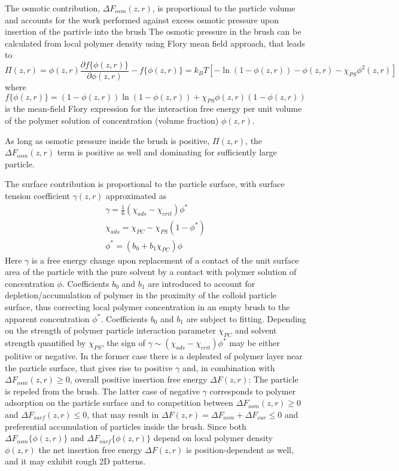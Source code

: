 \documentclass[12pt, a4paper]{article}
\begin{document}
The osmotic contribution, $\Delta F_{osm}(z,r)$, is proportional to the particle volume and accounts for the work performed against excess osmotic pressure upon insertion of the partivle into the brush
The osmotic pressure in the brush can be calculated from local polymer density using Flory mean field approach, that leads to 
\begin{equation}
	\Pi(z,r)=  \phi(z,r)\frac{\partial f\{\phi(z,r)\}}{\partial \phi(z,r)} - f\{\phi(z,r)\}= 
	k_BT[-\ln(1-\phi(z,r)) - \phi(z,r) -\chi_{PS}\phi^2(z,r)]
\end{equation}
where
$$
f\{\phi(z,r)\}=(1-\phi(z,r))\ln(1-\phi(z,r)) +\chi_{PS}\phi(z,r)(1-\phi(z,r))
$$
is the mean-field Flory expression for the interaction free energy per unit volume of the polymer solution of concentration (volume fraction) $\phi(z,r)$.

As long as osmotic pressure inside the brush is positive, $\Pi(z,r)$, the $\Delta F_{osm}(z,r)$ term is positive as well and dominating for sufficiently large particle. 

The surface contribution is proportional to the particle surface, with surface tension coefficient $\gamma (z,r)$ approximated as
\begin{eqnarray}
    \gamma = \frac{1}{6}(\chi_{ads} - \chi_{crit})\phi^{\ast}
    \\
    \chi_{ads} = \chi_{PC} - \chi_{PS}(1-\phi^{\ast})
    \\
    \phi^{\ast}= (b_{0} + b_{1}\chi_{PC})\phi
\end{eqnarray}
Here $\gamma$ is a free energy change upon replacement of a contact of the unit surface area of the particle with the pure solvent by a contact with polymer solution of concentration $\phi$.
Coefficients $b_0$ and $b_1$ are introduced to account for  depletion/accumulation of polymer in the proximity of the colloid particle surface, thus correcting local polymer concentration in an empty brush 
to the apparent concentration $\phi^{\ast}$. Coefficients $b_0$ and $b_1$ are subject to fitting.
Depending on the strength of polymer particle interaction parameter $\chi_{PC}$ and solvent strength quantified by  $\chi_{PS}$, the sign of $\gamma \sim (\chi_{ads} - \chi_{crit})\phi^{\ast}$ may be either politive or negative.
In the former case there is a depleated of polymer layer near the particle surface, that gives rise to positive $\gamma$ and, in combination with $\Delta F_{osm}(z,r)\geq 0$, overall positive insertion free energy $\Delta F(z,r)$: 
The particle is repeled from the brush. The latter case of negative $\gamma$ corresponds to polymer adsorption on the particle surface and to competition between $\Delta F_{osm}(z,r)\geq 0$ and $\Delta F_{surf}(z,r)\leq 0$, 
that may result in $\Delta F(z,r) = \Delta F_{osm} + \Delta F_{sur}\leq 0$ and preferential accumulation of particles inside the brush. Since both $\Delta F_{osm}\{\phi(z,r)\}$ and $\Delta F_{surf}\{\phi(z,r)\}$ depend
on local polymer density $\phi(z,r)$ the net insertion free energy $\Delta F(z,r)$ is position-dependent as well, and it may exhibit rough 2D patterns.
\end{document}
